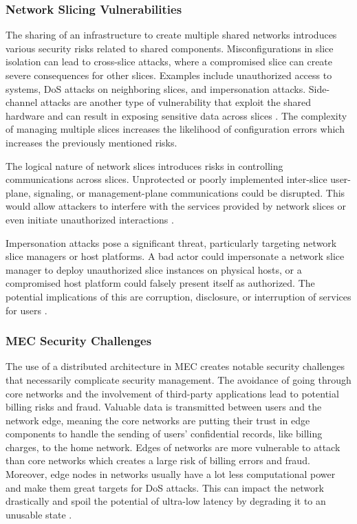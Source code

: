 \documentclass[acmtog]{acmart}
\begin{document}
\subsubsection{Network Slicing Vulnerabilities}
The sharing of an infrastructure to create multiple shared networks introduces various security risks related to shared components. Misconfigurations in slice isolation can lead to cross-slice attacks, where a compromised slice can create severe consequences for other slices. Examples include unauthorized access to systems, DoS attacks on neighboring slices, and impersonation attacks. Side-channel attacks are another type of vulnerability that exploit the shared hardware and can result in exposing sensitive data across slices \cite{ref3_2}. The complexity of managing multiple slices increases the likelihood of configuration errors which increases the previously mentioned risks.

 The logical nature of network slices introduces risks in controlling communications across slices. Unprotected or poorly implemented inter-slice user-plane, signaling, or management-plane communications could be disrupted. This would allow attackers to interfere with the services provided by network slices or even initiate unauthorized interactions \cite{ref3_2}. 

Impersonation attacks pose a significant threat, particularly targeting network slice managers or host platforms. A bad actor could impersonate a network slice manager to deploy unauthorized slice instances on physical hosts, or a compromised host platform could falsely present itself as authorized. The potential implications of this are corruption, disclosure, or interruption of services for users \cite{ref3_2}.

\subsubsection{MEC Security Challenges}
The use of a distributed architecture in MEC creates notable security challenges that necessarily complicate security management. The avoidance of going through core networks and the involvement of third-party applications lead to potential billing risks and fraud. Valuable data is transmitted between users and the network edge, meaning the core networks are putting their trust in edge components to handle the sending of users' confidential records, like billing charges, to the home network. Edges of networks are more vulnerable to attack than core networks which creates a large risk of billing errors and fraud. Moreover, edge nodes in networks usually have a lot less computational power and make them great targets for DoS attacks. This can impact the network drastically and spoil the potential of ultra-low latency by degrading it to an unusable state \cite{ref3_3}. 
\end{document}
